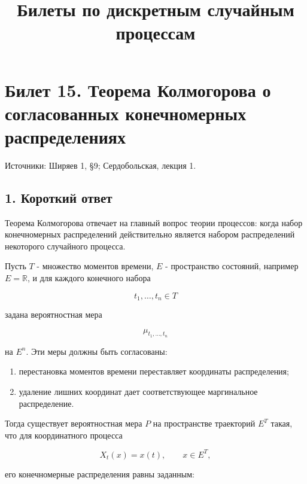 \documentclass[
  11pt,
  a4paper,
]{article}
\title{Билеты по дискретным случайным процессам}
\author{}
\date{}
\providecommand{\tightlist}{%
  \setlength{\itemsep}{0pt}\setlength{\parskip}{0pt}}
\begin{document}
\maketitle

\section{Билет 15. Теорема Колмогорова о согласованных конечномерных
распределениях}\label{ux431ux438ux43bux435ux442-15.-ux442ux435ux43eux440ux435ux43cux430-ux43aux43eux43bux43cux43eux433ux43eux440ux43eux432ux430-ux43e-ux441ux43eux433ux43bux430ux441ux43eux432ux430ux43dux43dux44bux445-ux43aux43eux43dux435ux447ux43dux43eux43cux435ux440ux43dux44bux445-ux440ux430ux441ux43fux440ux435ux434ux435ux43bux435ux43dux438ux44fux445}

Источники: Ширяев 1, §9; Сердобольская, лекция 1.

\subsection{1. Короткий
ответ}\label{ux43aux43eux440ux43eux442ux43aux438ux439-ux43eux442ux432ux435ux442}

Теорема Колмогорова отвечает на главный вопрос теории процессов: когда
набор конечномерных распределений действительно является набором
распределений некоторого случайного процесса.

Пусть \(T\) - множество моментов времени, \(E\) - пространство
состояний, например \(E=\mathbb R\), и для каждого конечного набора

\[
t_1,\ldots,t_n\in T
\]

задана вероятностная мера

\[
\mu_{t_1,\ldots,t_n}
\]

на \(E^n\). Эти меры должны быть согласованы:

\begin{enumerate}
\def\labelenumi{\arabic{enumi}.}
\tightlist
\item
  перестановка моментов времени переставляет координаты распределения;
\item
  удаление лишних координат дает соответствующее маргинальное
  распределение.
\end{enumerate}

Тогда существует вероятностная мера \(P\) на пространстве траекторий
\(E^T\) такая, что для координатного процесса

\[
X_t(x)=x(t),\qquad x\in E^T,
\]

его конечномерные распределения равны заданным:
\end{document}
